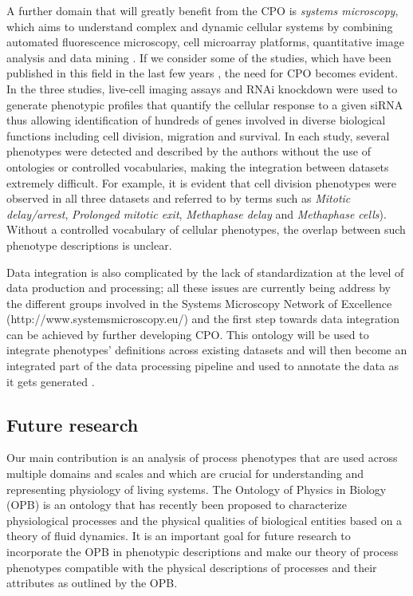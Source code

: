 \documentclass{bioinfo}
\renewcommand{\cite}{\citep}
\begin{document}
A further domain that will greatly benefit from the CPO is {\em
  systems microscopy}, which aims to understand complex and dynamic
cellular systems by combining automated fluorescence microscopy, cell
microarray platforms, quantitative image analysis and data mining
\cite{Lock2010}.  If we consider some of the studies, which have been
published in this field in the last few years \cite{Neumann2010,
  Schmitz2010short, Fuchs2010}, the need for CPO becomes evident.  In the
three studies, live-cell imaging assays and RNAi knockdown were used
to generate phenotypic profiles that quantify the cellular response to
a given siRNA thus allowing identification of hundreds of genes
involved in diverse biological functions including cell division,
migration and survival.  In each study, several phenotypes were
detected and described by the authors without the use of ontologies or
controlled vocabularies, making the integration between datasets
extremely difficult. For example, it is evident that cell division
phenotypes were observed in all three datasets and referred to by
terms such as {\em Mitotic delay/arrest}, {\em Prolonged mitotic
  exit}, {\em Methaphase delay} and {\em Methaphase cells}). Without a
controlled vocabulary of cellular phenotypes, the overlap between such
phenotype descriptions is unclear.

Data integration is also complicated by the lack of standardization at
the level of data production and processing; all these issues are
currently being address by the different groups involved in the
Systems Microscopy Network of Excellence
(http://www.systemsmicroscopy.eu/) and the first step towards data
integration can be achieved by further developing CPO.
This ontology will be used to integrate phenotypes' definitions across
existing datasets and will then become an integrated part of the data
processing pipeline and used to annotate the data as it gets generated
\cite{Conrad2011}.

\subsection{Future research}
Our main contribution is an analysis of process phenotypes that are
used across multiple domains and scales and which are crucial for
understanding and representing physiology of living systems. The
Ontology of Physics in Biology (OPB) \cite{opb} is an ontology that
has recently been proposed to characterize physiological processes and
the physical qualities of biological entities based on a theory of
fluid dynamics. It is an important goal for future research to
incorporate the OPB in phenotypic descriptions and make our theory of
process phenotypes compatible with the physical descriptions of
processes and their attributes as outlined by the OPB.
\end{document}
